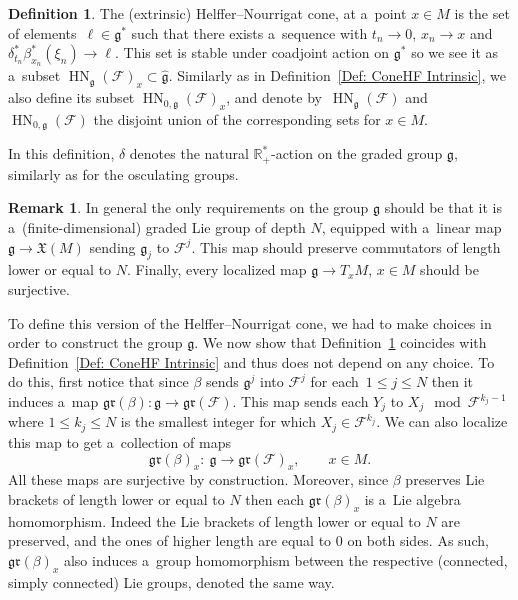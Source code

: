 \documentclass[10pt,a4paper]{article}
\newcommand{\R}{\mathbb R} %
\newcommand{\N}{\mathbb N} %
\newcommand{\F}{\mathcal{F}} %
\newcommand{\g}{\mathfrak{g}} %
\newcommand{\HN}{\operatorname{HN}} %
\newcommand{\Fb}{\mathcal{F}} %
\newcommand{\gr}{\mathfrak{gr}} %
\numberwithin{equation}{section}
\theoremstyle{definition}
\newtheorem{mydef}[thm]{Definition}
\newtheorem{rem}[thm]{Remark}
\begin{document}
\begin{mydef}\label{Def: ConeHN Extrinsic}
 The (extrinsic) Helffer--Nourrigat cone, at a~point $x\in M$ is the set of elements~${\ell \in \g^*}$ such that there exists a~sequence \smash{$((t_n,x_n,\xi_n))_{n\in \N} \in \bigl(\R^*_+ \times T^*M\bigr)^{\N}$} with $t_n\rightarrow 0$, $x_n\rightarrow x$ and $\delta_{t_n}^*\beta_{x_n}^*(\xi_n) \rightarrow \ell$.
 This set is stable under coadjoint action on $\g^*$ so we see it as a~subset $\HN_{\g}(\Fb)_x \subset \widehat{\g}$. Similarly as in Definition~\ref{Def: ConeHF Intrinsic}, we also define its subset $\HN_{0,\g}(\Fb)_x$, and denote by~$\HN_{\g}(\F)$ and $\HN_{0,\g}(\F)$ the disjoint union of the corresponding sets for $x\in M$.
\end{mydef}

In this definition, $\delta$ denotes the natural $\R^*_+$-action on the graded group $\g$, similarly as for the osculating groups.

\begin{rem}
 In general the only requirements on the group $\g$ should be that it is a~(finite-dimensional) graded Lie group of depth $N$, equipped with a~linear map $\g \to \mathfrak{X}(M)$ sending $\g_j$ to $\F^j$. This map should preserve commutators of length lower or equal to $N$. Finally, every localized map $\g \to T_xM$, $x\in M$ should be surjective.
\end{rem}

To define this version of the Helffer--Nourrigat cone, we had to make choices in order to construct the group $\g$. We now show that Definition~\ref{Def: ConeHN Extrinsic} coincides with Definition~\ref{Def: ConeHF Intrinsic} and thus does not depend on any choice. To do this, first notice that since $\beta$ sends $\g^j$ into $\F^j$ for each~${1\leq j \leq N}$ then it induces a~map $\gr(\beta) \colon \g \to \gr(\Fb)$.
This map sends each $Y_j$ to $X_j \mod \F^{k_j-1}$ where $1\leq k_j\leq N$ is the smallest integer for which $X_j \in \F^{k_j}$. We can also localize this map to get a~collection of maps
\[\gr(\beta)_x \colon\ \g \to \gr(\Fb)_x,\qquad x \in M.\]
All these maps are surjective by construction. Moreover, since $\beta$ preserves Lie brackets of length lower or equal to $N$ then each $\gr(\beta)_x$ is a~Lie algebra homomorphism. Indeed the Lie brackets of length lower or equal to $N$ are preserved, and the ones of higher length are equal to $0$ on both sides. As such, $\gr(\beta)_x$ also induces a~group homomorphism between the respective (connected, simply connected) Lie groups, denoted the same way.
\end{document}
